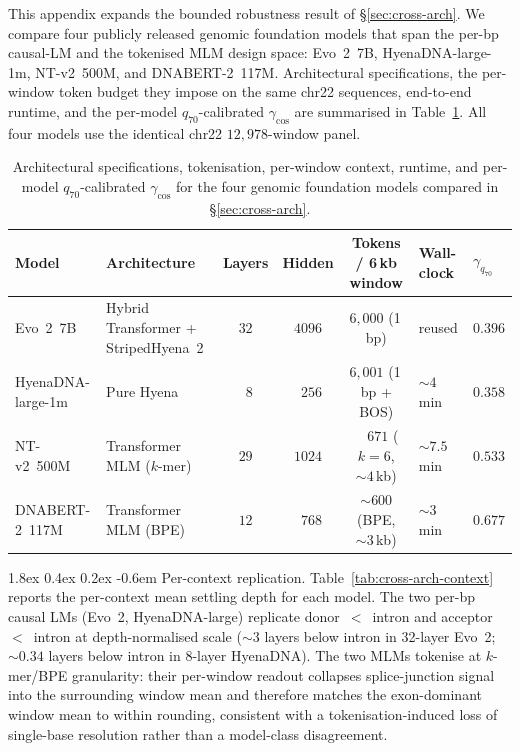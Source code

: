 \documentclass{article}
\makeatletter
\renewcommand\paragraph{\@startsection{paragraph}{4}{\z@}%
  {1.8ex \@plus 0.4ex \@minus 0.2ex}%
  {-0.6em}%
{\normalfont\normalsize\bfseries}}
\theoremstyle{plain}
\theoremstyle{definition}
\theoremstyle{remark}
\makeatother
\begin{document}
This appendix expands the bounded robustness result of
\S\ref{sec:cross-arch}. We compare four publicly released genomic
foundation models that span the per-bp causal-LM and the tokenised MLM
design space: Evo~2~7B, HyenaDNA-large-1m, NT-v2~500M, and
DNABERT-2~117M. Architectural specifications, the per-window token budget
they impose on the same chr22 sequences, end-to-end runtime, and the
per-model $q_{70}$-calibrated $\gamma_{\cos}$ are summarised in
Table~\ref{tab:fm-specs}. All four models use the identical chr22
$12{,}978$-window panel.

\begin{table}[!htbp]
  \caption{Architectural specifications, tokenisation, per-window context,
    runtime, and per-model $q_{70}$-calibrated $\gamma_{\cos}$ for the four
  genomic foundation models compared in \S\ref{sec:cross-arch}.}
  \label{tab:fm-specs}
  \centering
  \footnotesize
  \setlength{\tabcolsep}{4pt}
  \begin{tabular}{@{}llcccll@{}}
    \toprule
    Model & Architecture & Layers & Hidden & Tokens / 6\,kb window
    & Wall-clock & $\gamma_{q_{70}}$ \\
    \midrule
    Evo~2~7B          & Hybrid Transformer + StripedHyena~2 & $32$ & $4096$
    & $6{,}000$ (1\,bp)         & reused      & $0.396$ \\
    HyenaDNA-large-1m & Pure Hyena                          & $\phantom{0}8$ & $\phantom{0}256$
    & $6{,}001$ (1\,bp + BOS)   & $\sim 4$\,min    & $0.358$ \\
    NT-v2~500M        & Transformer MLM ($k$-mer)           & $29$ & $1024$
    & $\phantom{0,}671$ ($k=6$, $\sim 4$\,kb) & $\sim 7.5$\,min  & $0.533$ \\
    DNABERT-2~117M    & Transformer MLM (BPE)               & $12$ & $\phantom{0}768$
    & $\sim 600$ (BPE, $\sim 3$\,kb)        & $\sim 3$\,min    & $0.677$ \\
    \bottomrule
  \end{tabular}
\end{table}

\paragraph{Per-context replication.} Table~\ref{tab:cross-arch-context}
reports the per-context mean settling depth for each model. The two
per-bp causal LMs (Evo~2, HyenaDNA-large) replicate
donor~$<$~intron and acceptor~$<$~intron at depth-normalised scale
($\sim 3$ layers below intron in 32-layer Evo~2; $\sim 0.34$ layers below
intron in 8-layer HyenaDNA). The two MLMs tokenise at $k$-mer/BPE
granularity: their per-window readout collapses splice-junction signal
into the surrounding window mean and therefore matches the exon-dominant
window mean to within rounding, consistent with a tokenisation-induced
loss of single-base resolution rather than a model-class disagreement.
\end{document}
